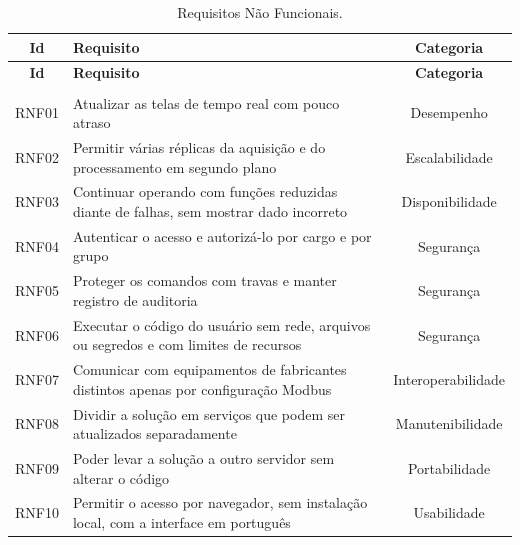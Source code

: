 {\renewcommand{\arraystretch}{1.3}\small
\begin{xltabular}{\textwidth}{c>{\centering\arraybackslash}Xc}
        \caption{Requisitos Não Funcionais.}
        \label{tab:requisitos_nao_funcionais}\\
        \hline
        \textbf{Id} & \textbf{Requisito} & \textbf{Categoria} \\
        \hline
        \endfirsthead
        \hline
        \textbf{Id} & \textbf{Requisito} & \textbf{Categoria} \\
        \hline
        \endhead
        \endfoot
         \\
        \endlastfoot
        RNF01       & Atualizar as telas de tempo real com pouco atraso & Desempenho         \\
        \hline
        RNF02       & Permitir várias réplicas da aquisição e do processamento em segundo plano & Escalabilidade     \\
        \hline
        RNF03       & Continuar operando com funções reduzidas diante de falhas, sem mostrar dado incorreto & Disponibilidade    \\
        \hline
        RNF04       & Autenticar o acesso e autorizá-lo por cargo e por grupo & Segurança          \\
        \hline
        RNF05       & Proteger os comandos com travas e manter registro de auditoria & Segurança          \\
        \hline
        RNF06       & Executar o código do usuário sem rede, arquivos ou segredos e com limites de recursos & Segurança          \\
        \hline
        RNF07       & Comunicar com equipamentos de fabricantes distintos apenas por configuração Modbus                              & Interoperabilidade \\
        \hline
        RNF08       & Dividir a solução em serviços que podem ser atualizados separadamente          & Manutenibilidade   \\
        \hline
        RNF09       & Poder levar a solução a outro servidor sem alterar o código  & Portabilidade      \\
        \hline
        RNF10       & Permitir o acesso por navegador, sem instalação local, com a interface em português                          & Usabilidade        \\
        \hline
\end{xltabular}}

\newpage
